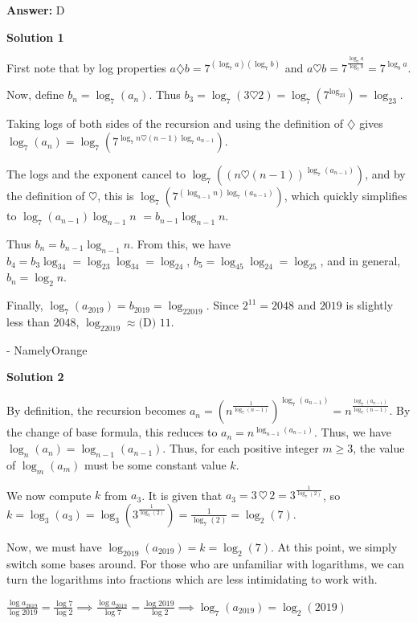 \begin{enumerate}
 \textbf{Answer: }D



\textbf{Solution 1}

First note that by log properties $a\diamondsuit b = 7^{(\log_7a)(\log_7b)}$ and $a \heartsuit b = 7^{\frac{\log_7a}{\log_7b}} = 7^{\log_ba}$.

 Now, define $b_n = \log_7(a_n)$. Thus $b_3 = \log_7(3\heartsuit 2) = \log_7(7^{\log_23}) = \log_23$.

 Taking logs of both sides of the recursion and using the definition of $\diamondsuit$ gives $\log_7(a_n) = \log_7(7^{\log_7n\heartsuit (n-1)\log_7a_{n-1}})$. 

 The logs and the exponent cancel to $\log_7((n\heartsuit (n-1))^{\log_7(a_{n-1})})$, and by the definition of $\heartsuit$, this is $\log_7(7^{(\log_{n-1}n)\log_7(a_{n-1})})$, which quickly simplifies to $\log_7(a_{n-1})\log_{n-1}n$ $= b_{n-1}\log_{n-1}n$.

 Thus $b_n = b_{n-1}\log_{n-1}n$. From this, we have $b_4 = b_3\log_34 = \log_23\log_34 = \log_24$, $b_5 = \log_45\log_24 = \log_25$, and in general, $b_n = \log_2n$.

 Finally, $\log_7(a_{2019}) = b_{2019}= \log_22019$. Since $2^{11} = 2048$ and $2019$ is slightly less than $2048$, $\log_22019 \approx \boxed{\text{(D) }11}$.

 - NamelyOrange

 



\textbf{Solution 2}

By definition, the recursion becomes $a_n = \left(n^{\frac1{\log_7(n-1)}}\right)^{\log_7(a_{n-1})}=n^{\frac{\log_7(a_{n-1})}{\log_7(n-1)}}$.  By the change of base formula, this reduces to $a_n = n^{\log_{n-1}(a_{n-1})}$.  Thus, we have $\log_n(a_n) = \log_{n-1}(a_{n-1})$.  Thus, for each positive integer $m \geq 3$, the value of $\log_m(a_m)$ must be some constant value $k$.  

 We now compute $k$ from $a_3$.  It is given that $a_3 = 3\,\heartsuit\,2 = 3^{\frac1{\log_7(2)}}$, so $k = \log_3(a_3) = \log_3\left(3^{\frac1{\log_7(2)}}\right) = \frac1{\log_7(2)} = \log_2(7)$.

 Now, we must have $\log_{2019}(a_{2019}) = k = \log_2(7)$. At this point, we simply switch some bases around. For those who are unfamiliar with logarithms, we can turn the logarithms into fractions which are less intimidating to work with.

 $\frac{\log{a_{2019}}}{\log{2019}} = \frac{\log{7}}{\log{2}}\implies \frac{\log{a_{2019}}}{\log{7}} = \frac{\log{2019}}{\log{2}}\implies \log_7(a_{2019}) =\log_2(2019)$


\end{enumerate}
